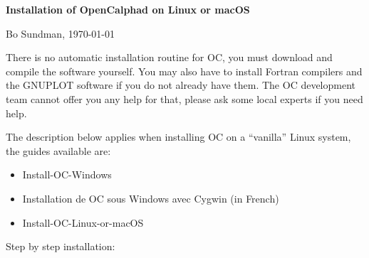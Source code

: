 \documentclass[12pt]{article}
\begin{document}
\begin{center}
{\Large \bf Installation of OpenCalphad on Linux or macOS}

Bo Sundman, \today

\end{center}

There is no automatic installation routine for OC, you must download
and compile the software yourself.  You may also have to install
Fortran compilers and the GNUPLOT software if you do not already have
them.  The OC development team cannot offer you any help for that,
please ask some local experts if you need help.

The description below applies when installing OC on a ``vanilla''
Linux system, the guides available are:
\begin{itemize}
\item Install-OC-Windows
\item Installation de OC sous Windows avec Cygwin (in French)
\item Install-OC-Linux-or-macOS
\end{itemize}

Step by step installation:
\end{document}

